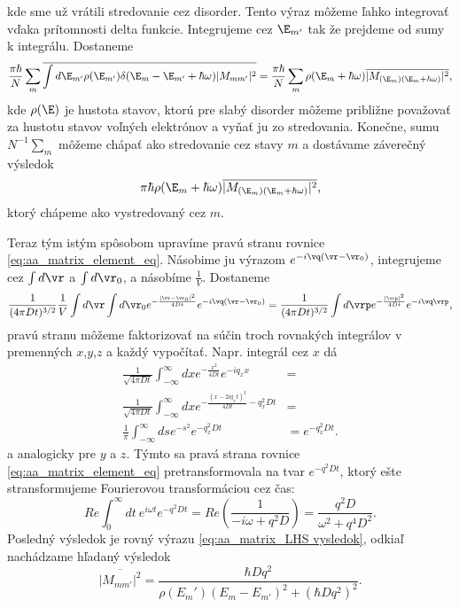 kde sme už vrátili stredovanie cez disorder. Tento výraz môžeme ľahko integrovať vďaka prítomnosti delta funkcie. Integrujeme cez $\E_{m'}$ tak že prejdeme od sumy k integrálu. Dostaneme
\begin{equation}
 \frac{\pi \hbar}{N}\sum_m  \overline{\int d\E_{m'} \rho(\E_{m'}) \delta(\E_m-\E_{m'}+\hbar \omega) |M_{mm'}|^2} =\frac{\pi \hbar}{N}\sum_m \rho(\E_{m}+\hbar\omega)\overline{|M_{(\E_m)(\E_m+\hbar\omega)}|^2} \text{,}
\end{equation}
kde $\rho(\E)$ je hustota stavov, ktorú pre slabý disorder môžeme približne považovať za hustotu stavov voľných elektrónov a vyňať ju zo stredovania. Konečne, sumu $N^{-1}\sum_m$ môžeme chápať ako stredovanie cez stavy $m$ a 
dostávame záverečný výsledok
\begin{equation}
 \label{eq:aa_matrix_LHS vysledok}
\pi \hbar \rho(\E_{m}+\hbar\omega)  \overline{|M_{(\E_m)(\E_m+\hbar\omega)}|^2} \text{,}
\end{equation}
ktorý chápeme ako vystredovaný cez $m$.


Teraz tým istým spôsobom upravíme pravú stranu rovnice \eqref{eq:aa_matrix_element_eq}. Násobime ju výrazom $e^{-i\vq(\vr-\vr_0)}$, integrujeme cez $\int d\vr$ a $\int d\vr_0$, a násobíme $\frac{1}{V}$. Dostaneme 
\begin{equation}
\label{eq:aa_matrix_RHS begin}
 \frac{1}{(4\pi Dt)^{3/2}}\frac{1}{V} \int d\vr \int d\vr_0 e^{-\frac{|\vr-\vr_0|^2}{4Dt}}e^{-i\vq(\vr-\vr_0)} =
 \frac{1}{(4\pi Dt)^{3/2}}\int d\vrp e^{-\frac{|\vrp|^2}{4Dt}}e^{-i\vq \vrp} \text{,}
\end{equation}
pravú stranu môžeme faktorizovať na súčin troch rovnakých integrálov v premenných $x$,$y$,$z$ a každý vypočítať. Napr. integrál cez $x$ dá
\begin{align*}
  \frac{1}{\sqrt{4\pi Dt}}\int_{-\infty}^{\infty} dx e^{-\frac{x^2}{4Dt}}e^{-iq_x x} &=\\
  \frac{1}{\sqrt{4\pi Dt}}\int_{-\infty}^{\infty} dx e^{-\frac{(x-2iq_xt)^2}{4Dt}-q_x^2Dt}&=\\
  \frac{1}{\pi}\int_{-\infty}^{\infty} ds e^{-s^2} e^{-q_x^2Dt}&= e^{-q_x^2Dt}\text{.}
\end{align*}
a analogicky pre $y$ a $z$.  Týmto sa pravá strana rovnice \eqref{eq:aa_matrix_element_eq} pretransformovala na tvar $e^{-q^2Dt}$,
ktorý ešte stransformujeme Fourierovou transformáciou cez čas:
\begin{equation}
\label{eq:aa_matrix_RHS}
 Re{\int_0^{\infty}dt\ e^{i\omega t}e^{-q^2Dt}}=Re(\frac{1}{-i\omega+q^2D})=\frac{q^2D}{\omega^2+q^4D^2}\text{.}
\end{equation}
Posledný výsledok je rovný výrazu \eqref{eq:aa_matrix_LHS vysledok}, odkiaľ nachádzame hľadaný výsledok
\begin{equation}
 \label{eq:aa_matrix_element_final}
 \overline{|M_{mm'}|^2}=\frac{\hbar D q^2}{\rho(E_m')(E_m-E_{m'})^2+(\hbar Dq^2)^2}\text{.}
\end{equation}

